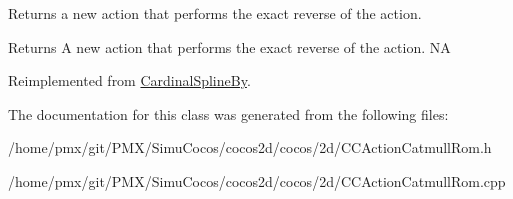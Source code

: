 Returns a new action that performs the exact reverse of the action.

\begin{DoxyReturn}{Returns}
A new action that performs the exact reverse of the action.  NA 
\end{DoxyReturn}


Reimplemented from \hyperlink{classCardinalSplineBy_ac5084ddc681589404f2a26d52815344b}{Cardinal\+Spline\+By}.



The documentation for this class was generated from the following files\+:\begin{DoxyCompactItemize}
\item 
/home/pmx/git/\+P\+M\+X/\+Simu\+Cocos/cocos2d/cocos/2d/C\+C\+Action\+Catmull\+Rom.\+h\item 
/home/pmx/git/\+P\+M\+X/\+Simu\+Cocos/cocos2d/cocos/2d/C\+C\+Action\+Catmull\+Rom.\+cpp\end{DoxyCompactItemize}
